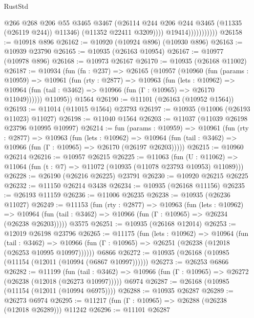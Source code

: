 \begin{lexlean}{RustStd}
\begin{coremodule}
{\begin{coremodule}
{{{{{{{{{{{{{{{{{{{{{{{{{{{{{{{{{{{{{{{{{{{{{{{{{{{{{{{{{{{{{{{{{{{{{{{{{{{{{{{{{{{{{                                @266
                                @268
                                @206
                                @55
                                @3465
                                @3467
                                (@26114 @244 @206 @244 @3465 (@11335 (@26119 @244)) @11346)
                                (@11352 @22411 @3209))))
                          @19414)))))))))))
@26158 := @10918 @896
@26162 := @10920 (@10924 @896) (@10930 @896)
@26163 := @10939 @23790
@26165 := @10935 (@26163 @10954)
@26167 := @10977 (@10978 @896)
@26168 := @10973 @26167
@26170 := @10935 (@26168 @11002)
@26187 := @10934
    (fun (fn : @237) =>
    @26165
      (@10957
        (@10960
          (fun (params : @10959) =>
          @10961
            (fun (rty : @2877) =>
            @10963
              (fun (lets : @10962) =>
              @10964 (fun (tail : @3462) => @10966 (fun (Γ : @10965) => @26170 @11049))))))
        @11095))
    @1564
@26190 := @11101 (@26163 (@10952 @1564))
@26193 := @11014 (@11015 @1564) @23793
@26197 := @10935 (@11006 (@26193 @11023) @11027)
@26198 := @11040 @1564
@26203 := @11037 (@11039 @26198 @23796 @10995 @10997)
@26214 := fun (params : @10959) =>
  @10961
    (fun (rty : @2877) =>
    @10963
      (fun (lets : @10962) =>
      @10964 (fun (tail : @3462) => @10966 (fun (Γ : @10965) => @26170 (@26197 @26203)))))
@26215 := @10960 @26214
@26216 := @10957 @26215
@26225 := @11063
    (fun (U : @11062) => @11064 (fun (t : @7) => @11072 (@10935 (@11078 @23793 @10953) @11089)))
@26228 := @26190 (@26216 @26225) @23791
@26230 := @10920 @26215 @26225
@26232 := @11150 @26214 @3438
@26234 := @10935 (@26168 @11156)
@26235 := @26193 @11159
@26236 := @11006 @26235
@26238 := @10935 (@26236 @11027)
@26249 := @11153
    (fun (rty : @2877) =>
    @10963
      (fun (lets : @10962) =>
      @10964 (fun (tail : @3462) => @10966 (fun (Γ : @10965) => @26234 (@26238 @26203)))))
    @3575
@26251 := @10935 (@26168 @12014)
@26253 := @12019 @26198 @23796
@26265 := @11175
    (fun (lets : @10962) =>
    @10964
      (fun (tail : @3462) =>
      @10966 (fun (Γ : @10965) => @26251 (@26238 (@12018 (@26253 @10995 @10997))))))
    @6866
@26272 := @10935 (@26168 (@10985 (@11154 (@12011 (@10994 (@6867 @10997))))))
@26273 := @26253 @6866
@26282 := @11199
    (fun (tail : @3462) => @10966 (fun (Γ : @10965) => @26272 (@26238 (@12018 (@26273 @10997)))))
    @6974
@26287 := @26168 (@10985 (@11154 (@12011 (@10994 @6975))))
@26288 := @10935 @26287
@26289 := @26273 @6974
@26295 := @11217 (fun (Γ : @10965) => @26288 (@26238 (@12018 @26289))) @11242
@26296 := @11101 @26287
}}}}}}}}}}}}}}}}}}}}}}}}}}}}}}}}}}}}}}}}}}}}}}}}}}}}}}}}}}}}}}}}}}}}}}}}}}}}}}}}}}}}}
\end{coremodule}}
\end{coremodule}
\end{lexlean}
